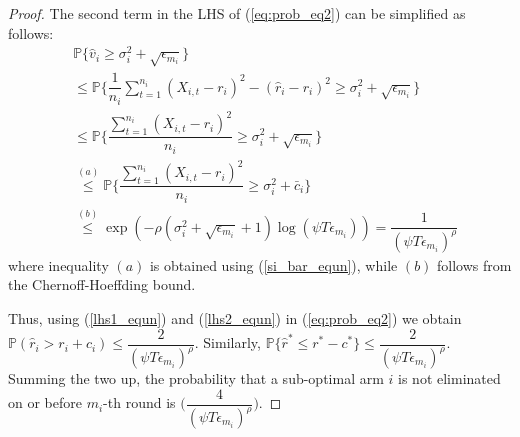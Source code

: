 \begin{proof}
 
The second term in the LHS of (\ref{eq:prob_eq2}) can be simplified as follows:
\begin{align}
&\mathbb{P}\bigg\lbrace \hat{v}_{i}\geq \sigma_{i}^{2}+\sqrt{\epsilon_{m_{i}}}\bigg\rbrace\nonumber\\
&\leq \mathbb{P}\bigg\lbrace \dfrac{1}{n_{i}}\sum_{t=1}^{n_{i}}(X_{i,t}-r_{i})^{2}-(\hat{r}_{i}-r_{i})^{2}\geq \sigma_{i}^{2}+\sqrt{\epsilon_{m_{i}}}\bigg\rbrace\nonumber\\
&\leq \mathbb{P}\bigg\lbrace \dfrac{\sum_{t=1}^{n_{i}}(X_{i,t}-r_{i})^{2}}{n_{i}}\geq \sigma_{i}^{2}+\sqrt{\epsilon_{m_{i}}} \bigg\rbrace\nonumber\\
&\overset{(a)}{\leq} \mathbb{P}\bigg\lbrace \dfrac{\sum_{t=1}^{n_{i}}(X_{i,t}-r_{i})^{2}}{n_{i}}\geq \sigma_{i}^{2} + \bar{c}_i\bigg\rbrace \nonumber\\
&\overset{(b)}{\leq} \exp\left(- \rho (\sigma_{i}^{2}+\sqrt{\epsilon_{m_{i}}} + 1)\log(\psi  T\epsilon_{m_{i}})\right)
= \dfrac{1}{(\psi  T\epsilon_{m_{i}})^{\rho}}
\label{lhs2_equn}
\end{align}
where inequality $(a)$ is obtained using (\ref{si_bar_equn}), while $(b)$ follows from the Chernoff-Hoeffding bound.
  
Thus, using (\ref{lhs1_equn}) and (\ref{lhs2_equn}) in (\ref{eq:prob_eq2}) we obtain $\mathbb{P}(\hat{r}_{i}> r_{i} + c_{i})\le \dfrac{2}{(\psi  T\epsilon_{m_{i}})^{\rho}}$. 
Similarly, $\mathbb{P}\lbrace\hat{r}^{*}\leq r^{*} - c^{*}\rbrace \leq \dfrac{2}{(\psi  T\epsilon_{m_{i}})^{\rho}}$. Summing the two up, the probability that a sub-optimal arm ${i}$ is not eliminated on or before $m_{i}$-th round is  $\bigg(\dfrac{4}{(\psi T\epsilon_{m_{i}})^{\rho}} \bigg)$.


\end{proof}
